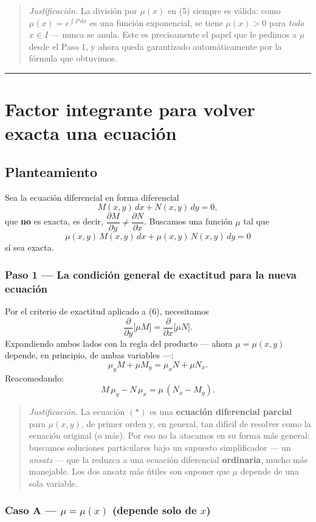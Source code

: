 \documentclass[12pt,letterpaper]{article}
\newcommand{\justif}[1]{%
  \par\noindent
  {\small\color{JustifColor}%
  \begin{quote}
  \textit{Justificación.} #1
  \end{quote}}%
}
\newcommand{\paso}[1]{\subsubsection*{#1}}
\begin{document}
\justif{La división por $\mu(x)$ en (5) siempre es válida: como
$\mu(x)=e^{\int P\,dx}$ es una función exponencial, se tiene $\mu(x)>0$ para
\emph{todo} $x \in I$ --- nunca se anula. Este es precisamente el papel que
le pedimos a $\mu$ desde el Paso 1, y ahora queda garantizado
automáticamente por la fórmula que obtuvimos.}

\bigskip
\hrule
\bigskip

\section{Factor integrante para volver exacta una ecuación}

\subsection*{Planteamiento}

Sea la ecuación diferencial en forma diferencial
\[
M(x,y)\,dx + N(x,y)\,dy = 0,
\]
que \textbf{no} es exacta, es decir, $\dfrac{\partial M}{\partial y} \neq
\dfrac{\partial N}{\partial x}$. Buscamos una función $\mu$ tal que
\begin{equation}
\mu(x,y)\,M(x,y)\,dx + \mu(x,y)\,N(x,y)\,dy = 0 \tag{6}
\end{equation}
sí sea exacta.

\paso{Paso 1 --- La condición general de exactitud para la nueva ecuación}

Por el criterio de exactitud aplicado a (6), necesitamos
\[
\frac{\partial}{\partial y}\big[\mu M\big] = \frac{\partial}{\partial x}\big[\mu N\big].
\]
Expandiendo ambos lados con la regla del producto --- ahora $\mu = \mu(x,y)$
depende, en principio, de ambas variables ---:
\[
\mu_y M + \mu M_y = \mu_x N + \mu N_x.
\]
Reacomodando:
\begin{equation}
M\,\mu_y - N\,\mu_x = \mu\,(N_x - M_y). \tag{$\ast$}
\end{equation}

\justif{La ecuación $(\ast)$ es una \textbf{ecuación diferencial parcial}
para $\mu(x,y)$, de primer orden y, en general, tan difícil de resolver como
la ecuación original (o más). Por eso no la atacamos en su forma más
general: buscamos soluciones particulares bajo un supuesto simplificador
--- un \emph{ansatz} --- que la reduzca a una ecuación diferencial
\textbf{ordinaria}, mucho más manejable. Los dos ansatz más útiles son
suponer que $\mu$ depende de una sola variable.}

\paso{Caso A --- $\mu = \mu(x)$ (depende solo de $x$)}
\end{document}
